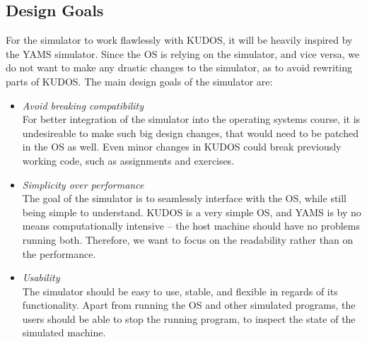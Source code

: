 \subsection{Design Goals}
For the simulator to work flawlessly with KUDOS, it will be heavily inspired by
the YAMS simulator. Since the OS is relying on the simulator, and vice versa,
we do not want to make any drastic changes to the simulator, as to avoid rewriting
parts of KUDOS. The main design goals of the simulator are:\\
\begin{itemize}
\item \textit{Avoid breaking compatibility}\\
For better integration of the simulator into the operating systems course, it is
undesireable to make such big design changes, that would need to be patched in
the OS as well. Even minor changes in KUDOS could break previously working
code, such as assignments and exercises.

\item \textit{Simplicity over performance}\\
The goal of the simulator is to seamlessly interface with the OS, while still
being simple to understand. KUDOS is a very simple OS, and YAMS is
by no means computationally intensive -- the host machine should have no problems
running both. Therefore, we want to focus on the readability rather than on the
performance.

\item \textit{Usability}\\
The simulator should be easy to use, stable, and flexible in regards of its
functionality.
Apart from running the OS and other simulated programs, the users should be able
to stop the running program, to inspect the state of the simulated machine.
\end{itemize}
